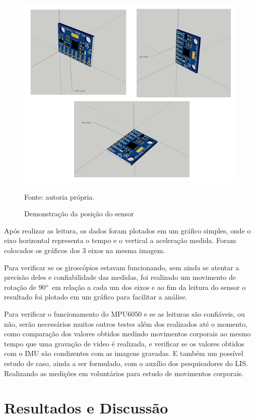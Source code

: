 	\begin{figure}[h]
		\centering
		\includegraphics[keepaspectratio=true,scale=1]{figuras/validacao_acel.PNG}
		\caption{Demonstração da posição do sensor}
		Fonte: autoria própria. 
		\label{acel_validation}	
	\end{figure}
	
	Após realizar as leitura, os dados foram plotados em um gráfico simples, onde o eixo horizontal representa o tempo e o vertical a aceleração medida. Foram colocados os gráficos dos 3 eixos na mesma imagem. 
	
	Para verificar se os giroscópios estavam funcionando, sem ainda se atentar a precisão deles e confiabilidade das medidas, foi realizado um movimento de rotação de 90$ \degree $ em relação a cada um dos eixos e ao fim da leitura do sensor o resultado foi plotado em um gráfico para facilitar a análise.
	
	Para verificar o funcionamento do MPU6050  e se as leituras são confiáveis, ou não, serão necessários muitos outros testes além dos realizados até o momento, como comparação dos valores obtidos medindo movimentos corporais ao mesmo tempo que uma gravação de video é realizada, e verificar se os valores obtidos com o IMU são condizentes com as imagens gravadas. E também um possível estudo de caso, ainda a ser formulado, com o auxílio dos pesquisadores do LIS. Realizando as medições em voluntários para estudo de movimentos corporais. 
	
	
\chapter{Resultados e Discussão}
